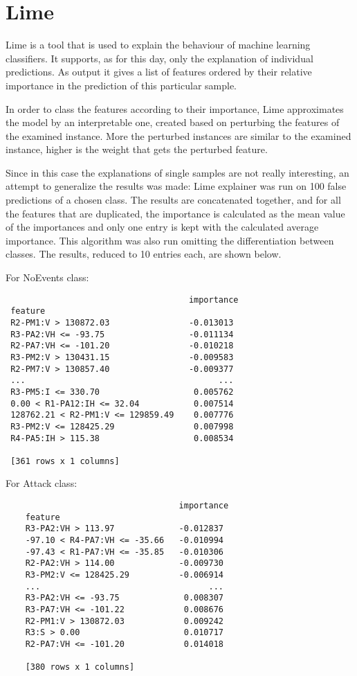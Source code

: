\section{Lime}
Lime is a tool that is used to explain the behaviour of machine learning classifiers. It supports, as for this day, only the explanation of individual predictions. As output it gives a list of features ordered by their relative importance in the prediction of this particular sample.

In order to class the features according to their importance, Lime approximates the model by an interpretable one, created based on perturbing the features of the examined instance. More the perturbed instances are similar to the examined instance, higher is the weight that gets the perturbed feature.

Since in this case the explanations of single samples are not really interesting, an attempt to generalize the results was made: Lime explainer was run on 100 false predictions of a chosen class. The results are concatenated together, and for all the features that are duplicated, the importance is calculated as the mean value of the importances and only one entry is kept with the calculated average importance. This algorithm was also run omitting the differentiation between classes. The results, reduced to 10 entries each, are shown below.

For NoEvents class:
\begin{verbatim}
                                     importance
 feature                                      
 R2-PM1:V > 130872.03                -0.013013
 R3-PA2:VH <= -93.75                 -0.011134
 R2-PA7:VH <= -101.20                -0.010218
 R3-PM2:V > 130431.15                -0.009583
 R2-PM7:V > 130857.40                -0.009377
 ...                                       ...
 R3-PM5:I <= 330.70                   0.005762
 0.00 < R1-PA12:IH <= 32.04           0.007514
 128762.21 < R2-PM1:V <= 129859.49    0.007776
 R3-PM2:V <= 128425.29                0.007998
 R4-PA5:IH > 115.38                   0.008534
 
 [361 rows x 1 columns]
\end{verbatim}

For Attack class:
\begin{verbatim}
                                   importance
    feature                                 
    R3-PA2:VH > 113.97             -0.012837
    -97.10 < R4-PA7:VH <= -35.66   -0.010994
    -97.43 < R1-PA7:VH <= -35.85   -0.010306
    R2-PA2:VH > 114.00             -0.009730
    R3-PM2:V <= 128425.29          -0.006914
    ...                                  ...
    R3-PA2:VH <= -93.75             0.008307
    R3-PA7:VH <= -101.22            0.008676
    R2-PM1:V > 130872.03            0.009242
    R3:S > 0.00                     0.010717
    R2-PA7:VH <= -101.20            0.014018
    
    [380 rows x 1 columns]
\end{verbatim}

